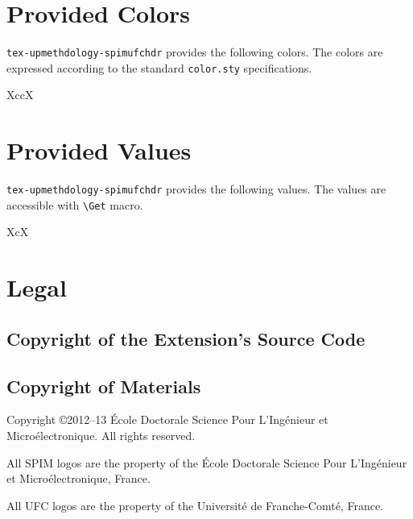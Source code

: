 \documentclass[english]{spimufchdr}
\gdef\upmextensiondoccolorlist{}
\gdef\upmextensiondocvaluelist{}
\begin{document}
\chapter{Provided Colors}

\texttt{tex-upmethdology-spimufchdr} provides the following colors. The colors are expressed according to the standard \texttt{color.sty} specifications.

\begin{mtabular}{4}{XccX}
\upmextensiondoccolorlist
\end{mtabular}

\chapter{Provided Values}

\texttt{tex-upmethdology-spimufchdr} provides the following values. The values are accessible with \texttt{{\textbackslash}Get} macro.

\begin{mtabular}{3}{XcX}
\upmextensiondocvaluelist
\end{mtabular}

\chapter{Legal}

\section{Copyright of the Extension's Source Code}



\section{Copyright of Materials}

Copyright \copyright 2012--13 \'Ecole Doctorale Science Pour L'Ing\'enieur et Micro\'electronique. All rights reserved.

All SPIM logos are the property of the \'Ecole Doctorale Science Pour L'Ing\'enieur et Micro\'electronique, France.

All UFC logos are the property of the Universit\'e de Franche-Comt\'e, France.
\end{document}
